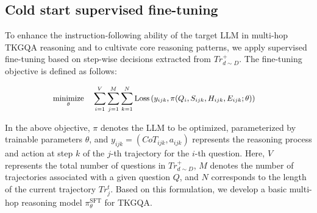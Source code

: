 \documentclass[letterpaper]{article} %
\begin{document}
\subsection{Cold start supervised fine-tuning}
To enhance the instruction-following ability of the target LLM in multi-hop TKGQA reasoning and to cultivate core reasoning patterns, we apply supervised fine-tuning based on step-wise decisions extracted from $Tr_{d \sim D}^+$. 
The fine-tuning objective is defined as follows:

\begin{equation}  
\small
	\begin{aligned}  
		& \underset{\theta}{\text{minimize}}  
		& & \sum_{i=1}^{V} \sum_{j=1}^{M} \sum_{k=1}^{N} \text{Loss}\left(y_{ijk}, \pi(Q_i, S_{ijk}, H_{ijk}, E_{ijk}; \theta)\right) 
	\end{aligned}
    \label{fine-tuning}
\end{equation}


In the above objective, $\pi$ denotes the LLM to be optimized, parameterized by trainable parameters ${\theta}$, and $y_{ijk} = (CoT_{ijk}, a_{ijk})$ represents the reasoning process and action at step $k$ of the $j$-th trajectory for the $i$-th question. Here, $V$ represents the total number of questions in $Tr_{d \sim D}^+$, $M$ denotes the number of trajectories associated with a given question $Q$, and $N$ corresponds to the length of the current trajectory $Tr_j^t$. Based on this formulation, we develop a basic multi-hop reasoning model $\pi_{\theta}^{\mathrm{SFT}}$ for TKGQA.
\end{document}
